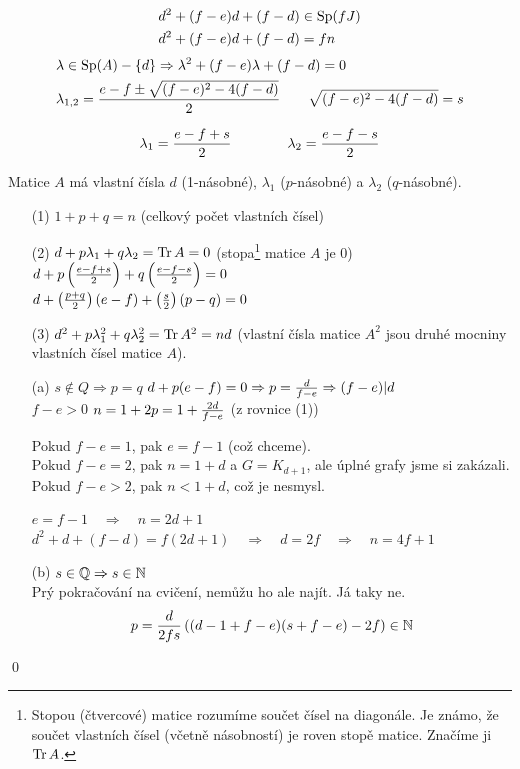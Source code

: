 \begin{align}
	&d^2 + (f-e)d + (f-d) \in \operatorname{Sp}(fJ) \\
	&d^2 + (f-e)d + (f-d) = fn \\
\end{align}
\begin{align}
	&\lambda \in \operatorname{Sp}(A) - \{d\} \Rightarrow \lambda^2 + (f-e)\lambda + (f-d) = 0 \\
	&\lambda_{1,2} = {e-f \pm \sqrt{(f-e)^2-4(f-d)} \over 2} \qquad \sqrt{(f-e)^2-4(f-d)} = s
\end{align}

$$\lambda_1 = {e-f+s\over 2}\qquad\qquad \lambda_2 = {e-f-s\over 2}$$

Matice $A$ má vlastní čísla $d$ (1-násobné), $\lambda_1$ ($p$-násobné) a
$\lambda_2$ ($q$-násobné).

\begin{enumerate}
	\item[(1)] $1 + p + q = n$ (celkový počet vlastních čísel)

	\item[(2)] $d + p\lambda_1 + q\lambda_2 = \operatorname{Tr} A = 0$ (stopa\footnote{Stopou (čtvercové) matice rozumíme součet čísel na diagonále. Je známo, že součet vlastních čísel (včetně násobností) je roven stopě matice. Značíme ji $\operatorname{Tr} A$.} matice $A$ je 0) \\
	$d + p\left({e-f+s\over 2}\right) + q\left({e-f-s\over 2}\right) = 0$ \\
	$d + \left({p+q\over 2}\right)(e-f) + \left({s\over 2}\right)(p-q) = 0$

	\item[(3)] $d^2 + p\lambda_1^2 + q\lambda_2^2 = \operatorname{Tr} A^2 = nd$ (vlastní čísla matice $A^2$ jsou druhé mocniny vlastních čísel matice $A$).
\end{enumerate}

\begin{enumerate}
	\item[(a)] $s\not\in Q \Rightarrow p = q$ \quad $d + p(e-f) = 0 \Rightarrow p = {d\over f-e} \Rightarrow (f-e)|d$ \\
	$f-e > 0$ \quad $n = 1 + 2p = 1 + {2d\over f-e}$ \quad (z rovnice (1))

	Pokud $f-e = 1$, pak $e = f-1$ (což chceme). \\
	Pokud $f-e = 2$, pak $n = 1+d$ a $G = K_{d+1}$, ale úplné grafy jsme si zakázali. \\
	Pokud $f-e > 2$, pak $n < 1+d$, což je nesmysl.

	$e = f-1 \quad\Rightarrow\quad n = 2d+1$ \\
	$d^2 + d + (f-d) = f(2d+1) \quad\Rightarrow\quad d = 2f \quad\Rightarrow\quad n = 4f+1$

	\item[(b)] $s\in\mathbb{Q}\Rightarrow s\in\mathbb{N}$ \\
	\todo Prý pokračování na cvičení, nemůžu ho ale najít. Já taky ne. \\
	$$p = {d\over 2fs}\left((d-1+f-e)(s+f-e)-2f\right) \in \mathbb{N}$$
\end{enumerate}
\qed


